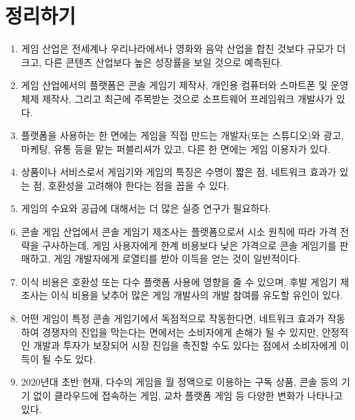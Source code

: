 \pagebreak

\section*{정리하기}
\begin{enumerate}
\item 게임 산업은 전세계나 우리나라에서나 영화와 음악 산업을 합친 것보다 규모가 더 크고, 다른 콘텐츠 산업보다 높은 성장률을 보일 것으로 예측된다.
\item 게임 산업에서의 플랫폼은 콘솔 게임기 제작사, 개인용 컴퓨터와 스마트폰 및 운영체제 제작사, 그리고 최근에 주목받는 것으로 소프트웨어 프레임워크 개발사가 있다.
\item 플랫폼을 사용하는 한 면에는 게임을 직접 만드는 개발자(또는 스튜디오)와 광고, 마케팅, 유통 등을 맡는 퍼블리셔가 있고, 다른 한 면에는 게임 이용자가 있다.
\item 상품이나 서비스로서 게임기와 게임의 특징은 수명이 짧은 점, 네트워크 효과가 있는 점, 호환성을 고려해야 한다는 점을 꼽을 수 있다.
\item 게임의 수요와 공급에 대해서는 더 많은 실증 연구가 필요하다.
\item 콘솔 게임 산업에서 콘솔 게임기 제조사는 플랫폼으로서 시소 원칙에 따라 가격 전략을 구사하는데, 게임 사용자에게 한계 비용보다 낮은 가격으로 콘솔 게임기를 판매하고, 게임 개발자에게 로열티를 받아 이득을 얻는 것이 일반적이다.
\item 이식 비용은 호환성 또는 다수 플랫폼 사용에 영향을 줄 수 있으며, 후발 게임기 제조사는 이식 비용을 낮추어 많은 게임 개발사의 개발 참여를 유도할 유인이 있다.
\item 어떤 게임이 특정 콘솔 게임기에서 독점적으로 작동한다면, 네트워크 효과가 작동하여 경쟁자의 진입을 막는다는 면에서는 소비자에게 손해가 될 수 있지만, 안정적인 개발과 투자가 보장되어 시장 진입을 촉진할 수도 있다는 점에서 소비자에게 이득이 될 수도 있다.
\item 2020년대 초반 현재, 다수의 게임을 월 정액으로 이용하는 구독 상품, 콘솔 등의 기기 없이 클라우드에 접속하는 게임, 교차 플랫폼 게임 등 다양한 변화가 나타나고 있다.
\end{enumerate}


